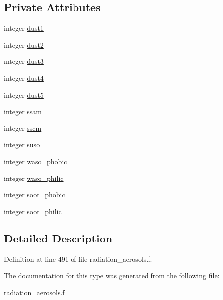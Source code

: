 \subsection*{Private Attributes}
\begin{DoxyCompactItemize}
\item 
integer \hyperlink{group__module__radiation__aerosols_gae87b7754284ce0d44cab3ab11c7d302d}{dust1}
\item 
integer \hyperlink{group__module__radiation__aerosols_gaaf95cb5b3df728ac3b333edd8ab7820f}{dust2}
\item 
integer \hyperlink{group__module__radiation__aerosols_ga5d844db6dd6100b45808b5e19b468a84}{dust3}
\item 
integer \hyperlink{group__module__radiation__aerosols_ga26a20aa03ac34523cc19644000d4924e}{dust4}
\item 
integer \hyperlink{group__module__radiation__aerosols_ga7d24acaa59ee8524dd8eca8f91f740c6}{dust5}
\item 
integer \hyperlink{group__module__radiation__aerosols_ga911c3dc2e5722a38166950003a4d0875}{ssam}
\item 
integer \hyperlink{group__module__radiation__aerosols_ga814b63e33cdf9c3e1e470406056a9fcb}{sscm}
\item 
integer \hyperlink{group__module__radiation__aerosols_ga1556732edff9dba1d6593a1117af056f}{suso}
\item 
integer \hyperlink{group__module__radiation__aerosols_ga9975caaff0c49d25180699beb469601f}{waso\+\_\+phobic}
\item 
integer \hyperlink{group__module__radiation__aerosols_ga05425c83c167f7820a126c72e561a4da}{waso\+\_\+philic}
\item 
integer \hyperlink{group__module__radiation__aerosols_gabe87221aca998b4d7ca231525e7dc355}{soot\+\_\+phobic}
\item 
integer \hyperlink{group__module__radiation__aerosols_gac382ab82531e2f1cb6021b786666f004}{soot\+\_\+philic}
\end{DoxyCompactItemize}


\subsection{Detailed Description}


Definition at line 491 of file radiation\+\_\+aerosols.\+f.



The documentation for this type was generated from the following file\+:\begin{DoxyCompactItemize}
\item 
\hyperlink{radiation__aerosols_8f}{radiation\+\_\+aerosols.\+f}\end{DoxyCompactItemize}
